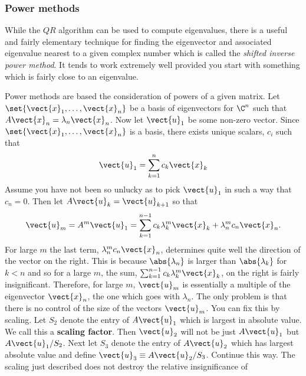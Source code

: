 \subsubsection{Power methods}

While the $QR$ algorithm can be used to compute eigenvalues, there is a useful and fairly elementary technique for
finding the eigenvector and associated eigenvalue nearest to a given complex number which
is called the {\em shifted inverse power method}. It tends to work extremely well provided you
start with something which is fairly close to an eigenvalue.

Power methods are based the consideration of powers of a given matrix. Let $
\set{
\vect{x}_{1},\ldots,\vect{x}_{n}} $ be a basis of eigenvectors for $
\C^{n}$ such that $A\vect{x}_{n}=\lambda _{n}\vect{x}_{n}$. Now let $
\vect{u}_{1}$ be some non-zero vector. Since $\set{\vect{x}_{1},\ldots,\vect{x}_{n}} $ is a basis, there exists unique scalars, $c_{i}$ such that 
\begin{equation*}
\vect{u}_{1}=\sum_{k=1}^{n}c_{k}\vect{x}_{k}
\end{equation*}
Assume you have not been so unlucky as to pick $\vect{u}_{1}$ in such a way
that $c_{n}=0$. Then let $A\vect{u}_{k}=\vect{u}_{k+1}$ so that 
\begin{equation}
\vect{u}_{m}=A^{m}\vect{u}_{1}=\sum_{k=1}^{n-1}c_{k}\lambda _{k}^{m}\vect{x}
_{k}+\lambda _{n}^{m}c_{n}\vect{x}_{n}.  \label{20-may-e1}
\end{equation}
For large $m$ the last term, $\lambda _{n}^{m}c_{n}\vect{x}_{n}$, determines
quite well the direction of the vector on the right. This is because $
\abs{\lambda _{n}}$ is larger than $\abs{\lambda
_{k}}$ for $k<n$ and so for a large $m$, the sum, $\sum_{k=1}^{n-1}c_{k}\lambda _{k}^{m}\vect{x}_{k}$, on the right is fairly
insignificant. Therefore, for large $m$, $\vect{u}_{m}$ is essentially a
multiple of the eigenvector $\vect{x}_{n}$, the one which goes with $\lambda
_{n}$. The only problem is that there is no control of the size of the
vectors $\vect{u}_{m}$. You can fix this by scaling. Let $S_{2}$ denote the
entry of $A\vect{u}_{1}$ which is largest in absolute value. We call this a 
 \textbf{scaling factor}. Then $\vect{u}_{2}$ will not be just $A\vect{u}_{1}$ but $A\vect{u}_{1}/S_{2}$. Next
let $S_{3}$ denote the entry of $A\vect{u}_{2}$ which has largest absolute
value and define $\vect{u}_{3}\equiv A\vect{u}_{2}/S_{3}$. Continue this way.
The scaling just described does not destroy the relative insignificance of
